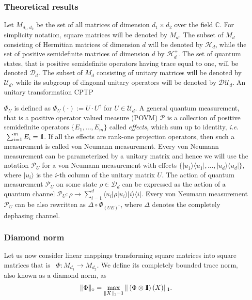 \documentclass[preprint,12pt, a4paper]{elsarticle}
\newcommand{\ie}{{\emph{i.e.\/}}}
\newcommand{\ket}[1]{\ensuremath{|#1\rangle}}
\newcommand{\bra}[1]{\ensuremath{\langle#1|}}
\newcommand{\ketbra}[2]{\ensuremath{\ket{#1}\bra{#2}}}
\newcommand{\proj}[1]{\ensuremath{\ketbra{#1}{#1}}}
\newcommand{\1}{{\rm 1\hspace{-0.9mm}l}}
\newcommand{\DD}{\mathcal{D}}
\newcommand{\PP}{\mathcal{P}}
\newcommand{\UU}{\mathcal{U}}
\newcommand{\HH}{\mathcal{H}}
\begin{document}
\subsubsection{Theoretical results}



Let $M_{d_1,d_2}$ be the set of all matrices of dimension $d_1 \times d_2$ over
the field $\mathbb{C}$. For  simplicity notation, square matrices will be denoted by
$M_d$.  The subset of $M_d$ consisting of Hermitian matrices of dimension $d$ will  be  denoted  by $\HH_d$,  while  the  set  of  positive semidefinite matrices of dimension $d$ by $\HH_d^+$. The set of quantum states, that is positive semidefinite operators having
trace equal to one, will be denoted $\DD_d$.  The subset of $M_d$ consisting of unitary matrices will be denoted by
$\UU_d$, while its subgroup of diagonal unitary operators will be denoted by
$\DD \UU_d$.  An unitary transformation 
 CPTP 

$\Phi_{U}$ is defined as $\Phi_U(\cdot) := U \cdot U^\dagger$ for  $U \in \UU_d$. A general quantum
measurement, that is a positive operator valued measure (POVM) $\PP$ is a
collection of positive semidefinite operators $\{E_1, \ldots, E_m \}$ called
\emph{effects}, which sum up to identity, \ie $ \, \, \sum_{i=1}^m E_i = \1$. If
all the effects are rank-one projection operators, then such a measurement is
called von Neumann measurement. Every von Neumann measurement can be
parameterized by a unitary matrix and hence we will use the notation $\PP_{U}$
for a von Neumann measurement with effects $\{\proj{u_1}, \ldots, \proj{u_d}\}$,
where $\ket{u_i}$ is the $i$-th column of the unitary matrix $U$. The action of
quantum measurement $\PP_{U}$ on some state $\rho \in \mathcal{D}_d$ can be
expressed as the action of a quantum channel
$
\PP_{U} : \rho \rightarrow \sum_{i=1}^d \bra{u_i} \rho \ket{u_i} \proj{i}.
$ Every von Neumann measurement  $\PP_{U}$ can be also rewritten as $\Delta \circ \Phi_{(UE)^\dagger}$, where $\Delta$ denotes the completely dephasing channel.  








\subsubsection{Diamond norm}
Let us now consider linear mappings transforming  square matrices into square 
matrices 
that is \ $\Phi: M_{d_1} \to M_{d_2}$. 
 We define its completely bounded trace
norm, also known as a diamond norm, as
\begin{equation}
\|\Phi\|_\diamond = \max_{\|X\|_1=1} \| \left(\Phi \otimes \1\right) (X) \|_1.
\end{equation}
\end{document}
